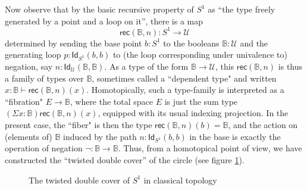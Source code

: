 \documentclass[11pt]{article}
\newcommand{\B}{\ensuremath{\mathbb{B}}}
\newcommand{\Id}{\mathsf{Id}}
\newcommand{\id}[1]{\Id_{#1}}
\newcommand{\rec}{\mathsf{rec}}
\newcommand{\U}{\ensuremath{\mathcal{U}}}
\theoremstyle{remark}
\theoremstyle{definition}
\begin{document}
Now observe that by the basic recursive property of $S^1$ as ``the type freely generated by a point and a loop on it'', there is a map $$\rec(\B,n): S^1 \to \U$$ determined by sending the base point $b:S^1$ to the booleans $\B:\U$ and the generating loop $p : \id{S^1}(b,b)$ to (the loop corresponding under univalence to) negation, say $n : \id{\U}(\B,\B)$.  As a type of the form $\B\to\U$, this $\rec(\B,n)$ is thus a family of types over $\B$, sometimes called a ``dependent type" and written $x:\B \vdash \rec(\B,n)(x)$.  Homotopically, such a type-family is interpreted as a ``fibration" $E\to\B$, where the total space $E$ is just the sum type $(\Sigma{x:\B})\rec(\B,n)(x)$, equipped with its usual indexing projection.  In the present case, the ``fiber" is then the type $\rec(\B,n)(b) = \B$, and the action on (elements of) $\B$ induced by the path $n: \id{S^1}(b,b)$ in the base is exactly the operation of negation $\neg : \B\to \B$.  Thus, from a homotopical point of view, we have constructed the ``twisted double cover'' of the circle (see figure \ref{fig:winding}).
%
%
\begin{figure}\centering
  \caption{The twisted double cover of $S^1$ in classical topology}\label{fig:winding}
\end{figure}
%
\end{document}
